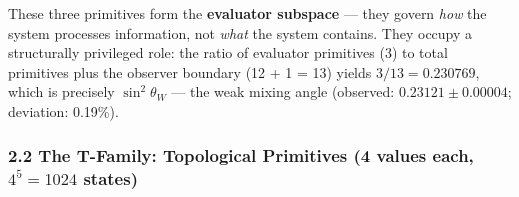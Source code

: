 These three primitives form the \textbf{evaluator subspace} --- they
govern \emph{how} the system processes information, not \emph{what} the
system contains. They occupy a structurally privileged role: the ratio
of evaluator primitives (3) to total primitives plus the observer
boundary (12 + 1 = 13) yields \(3/13 = 0.230769\), which is precisely
\(\sin^2\theta_W\) --- the weak mixing angle (observed:
\(0.23121 \pm 0.00004\); deviation: 0.19\%).

\hypertarget{the-t-family-topological-primitives-4-values-each-45-1024-states}{%
\subsubsection{\texorpdfstring{2.2 The T-Family: Topological Primitives
(4 values each, \(4^5 = 1024\)
states)}{2.2 The T-Family: Topological Primitives (4 values each, 4\^{}5 = 1024 states)}}\label{the-t-family-topological-primitives-4-values-each-45-1024-states}}

